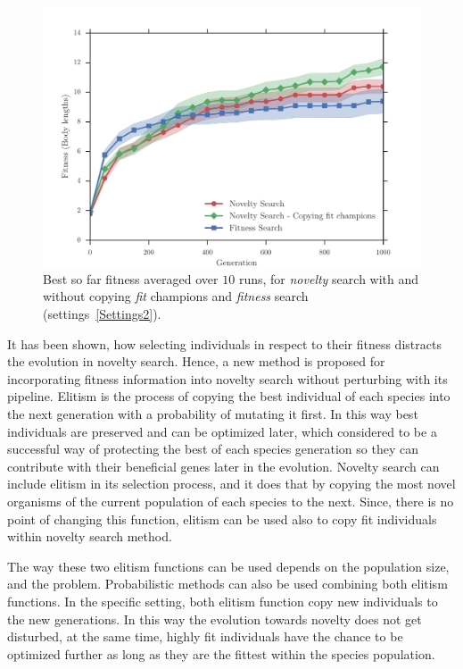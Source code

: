 \begin{figure}[t!]
\centering
\includegraphics[width=1.0\textwidth]{../Figures/Results/CopyFitChampions10.pdf}
\caption{Best so far fitness averaged over $10$ runs, for \emph{novelty} search with and without copying \emph{fit} champions and \emph{fitness} search (settings~\ref{Settings2}).}
\label{fig:CopyFitChampions10}
\end{figure}

It has been shown, how selecting individuals in respect to their fitness distracts the evolution in novelty search. Hence, a new method is proposed for incorporating fitness information into novelty search without perturbing with its pipeline. Elitism is the process of copying the best individual of each species into the next generation with a probability of mutating it first. In this way best individuals are preserved and can be optimized later, which considered to be a successful way of protecting the best of each species generation so they can contribute with their beneficial genes later in the evolution. Novelty search can include elitism in its selection process, and it does that by copying the most novel organisms of the current population of each species to the next. Since, there is no point of changing this function, elitism can be used also to copy fit individuals within novelty search method. 

The way these two elitism functions can be used depends on the population size, and the problem. Probabilistic methods can also be used combining both elitism functions. In the specific setting, both elitism function copy new individuals to the new generations. In this way the evolution towards novelty does not get disturbed, at the same time, highly fit individuals have the chance to be optimized further as long as they are the fittest within the species population.

